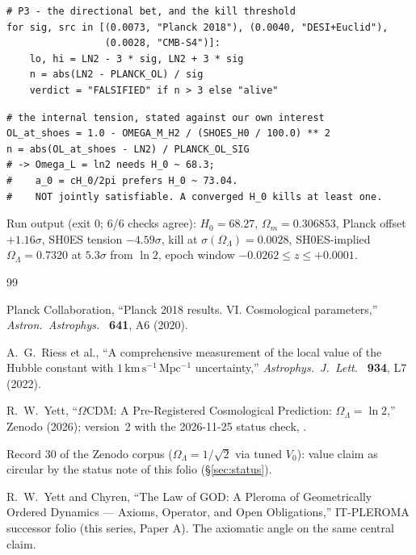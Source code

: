 \documentclass{alienfolio}
\begin{document}
\begin{lstlisting}
# P3 - the directional bet, and the kill threshold
for sig, src in [(0.0073, "Planck 2018"), (0.0040, "DESI+Euclid"),
                 (0.0028, "CMB-S4")]:
    lo, hi = LN2 - 3 * sig, LN2 + 3 * sig
    n = abs(LN2 - PLANCK_OL) / sig
    verdict = "FALSIFIED" if n > 3 else "alive"
\end{lstlisting}

\begin{lstlisting}
# the internal tension, stated against our own interest
OL_at_shoes = 1.0 - OMEGA_M_H2 / (SHOES_H0 / 100.0) ** 2
n = abs(OL_at_shoes - LN2) / PLANCK_OL_SIG
# -> Omega_L = ln2 needs H_0 ~ 68.3;
#    a_0 = cH_0/2pi prefers H_0 ~ 73.04.
#    NOT jointly satisfiable. A converged H_0 kills at least one.
\end{lstlisting}

Run output (exit 0; 6/6 checks agree): $H_{0} = 68.27$,
$\Omega_{m} = 0.306853$, Planck offset $+1.16\sigma$, SH0ES tension
$-4.59\sigma$, kill at $\sigma(\Omega_{\Lambda}) = 0.0028$,
SH0ES-implied $\Omega_{\Lambda} = 0.7320$ at $5.3\sigma$ from
$\ln 2$, epoch window $-0.0262 \le z \le +0.0001$.

\goldrule

\begin{thebibliography}{99}

 Planck Collaboration, ``Planck 2018 results. VI.
Cosmological parameters,'' \emph{Astron.\ Astrophys.\ } \textbf{641},
A6 (2020).

 A.~G.~Riess et al., ``A comprehensive measurement of
the local value of the Hubble constant with $1\,\mathrm{km\,s^{-1}\,
Mpc^{-1}}$ uncertainty,'' \emph{Astrophys.\ J.\ Lett.\ }
\textbf{934}, L7 (2022).

 R.~W.~Yett, ``$\Omega$CDM: A Pre-Registered
Cosmological Prediction: $\Omega_{\Lambda} = \ln 2$,''
Zenodo  (2026); version~2 with the
2026-11-25 status check, .

 Record 30 of the Zenodo corpus
($\Omega_{\Lambda} = 1/\sqrt{2}$ via tuned $V_{0}$): value claim
 as circular by the status note of this folio
(\S\ref{sec:status}).

 R.~W.~Yett and Chyren, ``The Law of GOD: A Pleroma
of Geometrically Ordered Dynamics --- Axioms, Operator, and Open
Obligations,'' IT-PLEROMA successor folio (this series, Paper A).
The axiomatic angle on the same central claim.

\end{thebibliography}
\end{document}
